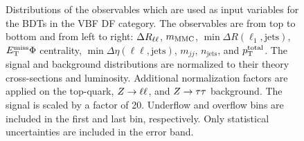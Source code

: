 \begin{figure}[htb]
\begin{subfigure}[t]{0.3\textwidth}
    \end{subfigure}
    \caption{Distributions of the observables which are used as input variables for the BDTs in the VBF DF category.
             The observables are from top to bottom and from left to right: $\Delta R_{\ell\ell}$, $m_\text{MMC}$, $\min \Delta R (\ell_1, \text{jets})$,
             $E_\text{T}^\text{miss} \Phi$ centrality, $\min \Delta \eta (\ell\ell, \text{jets})$, $m_{jj}$, $n_\text{jets}$, and $p_\text{T}^\text{total}$.
             The signal and background distributions are normalized to their theory cross-sections and luminosity.
             Additional normalization factors are applied on the top-quark, $Z \to \ell \ell$, and $Z \to \tau \tau$ background.
             The signal is scaled by a factor of 20.
             Underflow and overflow bins are included in the first and last bin, respectively.
             Only statistical uncertainties are included in the error band.}\label{fig:mva:modeling:sr:vbfdf}
\end{figure}

